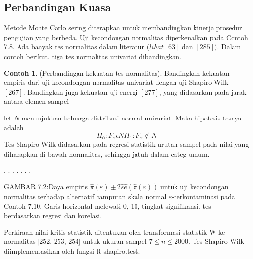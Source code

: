 \documentclass[a4paper,12pt]{article}
\theoremstyle{definition}
\newtheorem{example}{Contoh}[section]
\begin{document}
\subsection{Perbandingan Kuasa}
Metode Monte Carlo sering diterapkan untuk membandingkan kinerja prosedur pengujian yang berbeda. Uji kecondongan normalitas diperkenalkan pada Contoh 7.8. Ada banyak tes normalitas dalam literatur $(lihat [63]$ dan $[285]).$ Dalam contoh berikut, tiga tes normalitas univariat dibandingkan.
\begin{example}
     (Perbandingan kekuatan tes normalitas). Bandingkan kekuatan empiris dari uji kecondongan normalitas univariat dengan uji Shapiro-Wilk $[267]$. Bandingkan juga kekuatan uji energi $[277]$, yang didasarkan pada jarak antara elemen sampel
\end{example}
let $N$ menunjukkan keluarga distribusi normal univariat. Maka hipotesis tesnya adalah 
\begin{equation}
    H_{0} : F_{x}  \epsilon N       
   H_{1} : F_{x} \notin N
\end{equation}
Tes Shapiro-Wilk didasarkan pada regresi statistik urutan sampel pada nilai yang diharapkan di bawah normalitas, sehingga jatuh dalam categ umum.

.
.
.
.
.
.
.

GAMBAR 7.2:Daya empiris $\hat{\pi}(\varepsilon)\pm2\hat{se}(\hat{\pi}(\varepsilon))$ untuk uji kecondongan normalitas terhadap alternatif campuran skala normal $\varepsilon$-terkontaminasi pada Contoh 7.10. Garis horizontal melewati 0, 10, tingkat signifikansi. tes berdasarkan regresi dan korelasi. 

Perkiraan nilai kritis statistik ditentukan oleh transformasi statistik W ke normalitas [252, 253, 254] untuk ukuran sampel $7\leq n\leq 2000$. Tes Shapiro-Wilk diimplementasikan oleh fungsi R shapiro.test.
\end{document}
